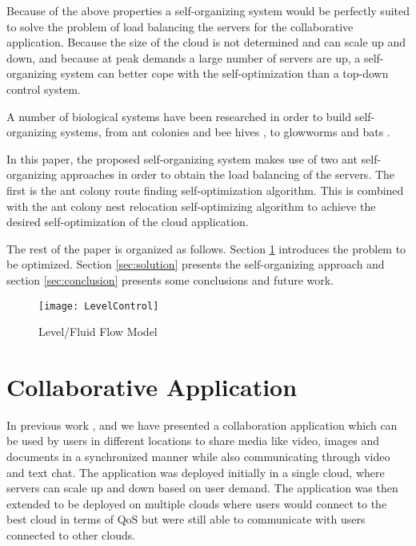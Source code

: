 \documentclass{sig-alternate}
\begin{document}
Because of the above properties a self-organizing system would be perfectly suited to solve the problem of load balancing the servers for the collaborative application. Because the size of the cloud is not determined and can scale up and down, and because at peak demands a large number of servers are up, a self-organizing system can better cope with the self-optimization than a top-down control system.

A number of biological systems have been researched in order to build self-organizing systems, from ant colonies and bee hives \cite{antalgorithm}, \cite{beehive} to glowworms \cite{glowworm} and bats \cite{bat}.

In this paper, the proposed self-organizing system makes use of two ant self-organizing approaches in order to obtain the load balancing of the servers. The first is the ant colony route finding self-optimization algorithm. This is combined with the ant colony nest relocation self-optimizing algorithm to achieve the desired self-optimization of the cloud application.

The rest of the paper is organized as follows. Section \ref{sec:problem} introduces the problem to be optimized. Section \ref{sec:solution} presents the self-organizing approach and section \ref{sec:conclusion} presents some conclusions and future work.

\begin{figure}[htb!]
\texttt{[image: LevelControl]}
\caption{Level/Fluid Flow Model}
\label{fig:LevelControl}
\end{figure}

\section{Collaborative Application}
\label{sec:problem}

In previous work \cite{bogdan:cts2012}, \cite{bogdan:miles2012chapter} and \cite{bogdan:amgcc2013} we have presented a collaboration application which can be used by users in different locations to share media like video, images and documents in a synchronized manner while also communicating through video and text chat. The application was deployed initially in a single cloud, where servers can scale up and down based on user demand. The application was then extended to be deployed on multiple clouds where users would connect to the best cloud in terms of QoS but were still able to communicate with users connected to other clouds.
\end{document}
